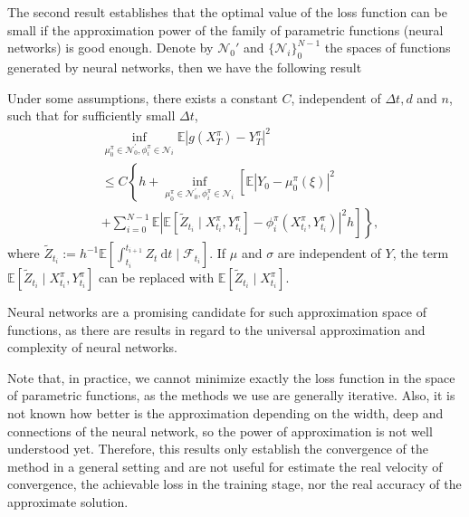 The second result establishes that the optimal value of the loss function can be small if the approximation power of the family of parametric functions (neural networks) is good enough. Denote by $\mathcal{N}_0'$ and $\{\mathcal{N}_i\}_{0}^{N-1}$ the spaces of functions generated by neural networks, then we have the following result
\begin{theorem}
Under some assumptions, there exists a constant $C$, independent of $\Delta t, d$ and $n$, such that for sufficiently small $\Delta t$,
	$$
	\begin{aligned}
		& \inf _{\mu_0^\pi \in \mathcal{N}_0^{\prime}, \phi_i^\pi \in \mathcal{N}_i} \mathbb{E}\left|g\left(X_T^\pi\right)-Y_T^\pi\right|^2 \\
		& \leq C\left\{h+\inf _{\mu_0^\pi \in \mathcal{N}_0^{\prime}, \phi_i^\pi \in \mathcal{N}_i}\left[\mathbb{E}\left|Y_0-\mu_0^\pi(\xi)\right|^2\right.\right. \\
		&\left.\left.+\sum_{i=0}^{N-1} \mathbb{E}\left|\mathbb{E}\left[\tilde{Z}_{t_i} \mid X_{t_i}^\pi, Y_{t_i}^\pi\right]-\phi_i^\pi\left(X_{t_i}^\pi, Y_{t_i}^\pi\right)\right|^2 h\right]\right\},
	\end{aligned}
	$$
	where $\tilde{Z}_{t_i}:=h^{-1} \mathbb{E}\left[\int_{t_i}^{t_{i+1}} Z_t \mathrm{~d} t \mid \mathcal{F}_{t_i}\right]$. If $\mu$ and $\sigma$ are independent of $Y$, the term $\mathbb{E}\left[\tilde{Z}_{t_i} \mid X_{t_i}^\pi, Y_{t_i}^\pi\right]$ can be replaced with $\mathbb{E}\left[\tilde{Z}_{t_i} \mid X_{t_i}^\pi\right]$.
\end{theorem}

Neural networks are a promising candidate for such approximation space of functions, as there are results in regard
to the universal approximation and complexity of neural networks.

Note that, in practice, we cannot minimize exactly the loss function in the space of parametric functions, as the methods we use are generally iterative. Also, it is not known how better is the approximation depending on the width, deep and connections of the neural network, so the power of approximation is not well understood yet. Therefore, this results only establish the convergence of the method in a general setting and are not useful for estimate the real velocity of convergence, the achievable loss in the training stage, nor the real accuracy of the approximate solution.  

